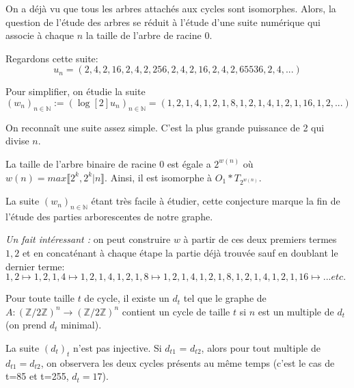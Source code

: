 \begin{rem}
On a d\'ej\`a vu que tous les arbres attach\'es aux cycles sont isomorphes. Alors, la question de l'\'etude des arbres se r\'eduit \`a l'\'etude d'une suite num\'erique qui associe \`a chaque $n$ la taille de l'arbre de racine $0$.

Regardons cette suite: \[u_n= (2,4,2,16,2,4,2,256,2,4,2,16,2,4,2,65536,2,4,...)\]

Pour simplifier, on \'etudie la suite 
\[({w_n})_{n \in \mathbb{N}} :=(\log[2]{u_n})_{n \in \mathbb{N}}= (1,2,1,4,1,2,1,8,1,2,1,4,1,2,1,16,1,2,...)\]

On reconna\^it une suite assez simple. C'est la plus grande puissance de 2 qui divise $n$.
\end{rem}

\begin{conj}\label{conj1}
La taille de l'arbre binaire de racine $0$ est \'egale a $2^{w(n)}$ o\`u $w(n) = max \llbracket 2^k, 2^k | n\rrbracket $. Ainsi, il est isomorphe \`a $O_1*T_{2^{w(n)}}$.
\end{conj}

La suite $(w_n)_{n \in \mathbb{N}}$ \'etant tr\`es facile \`a \'etudier, cette conjecture marque la fin de l'\'etude des parties arborescentes de notre graphe.

\begin{rem}
\textit{Un fait int\'eressant :} on peut construire $w$ \`a partir de ces deux premiers termes $1,2$ et en concat\'enant \`a chaque \'etape la partie d\'ej\`a trouv\'ee sauf en doublant le dernier terme: $1,2 \mapsto 1,2,1,4 \mapsto 1,2,1,4,1,2,1,8 \mapsto 1,2,1,4,1,2,1,8,1,2,1,4,1,2,1,16 \mapsto ... etc.$
\end{rem}

\begin{conj}\label{conj2}
Pour toute taille $t$ de cycle, il existe un $d_t$ tel que le graphe de $A: (\mathbb{Z}/2\mathbb{Z})^n \rightarrow (\mathbb{Z}/2\mathbb{Z})^n$ contient un cycle de taille $t$ si $n$ est un multiple de $d_t$ (on prend $d_t$ minimal). 
\end{conj}

\begin{rem}
La suite $(d_t)_t$ n'est pas injective. Si $d_{t1}$ = $d_{t2}$, alors pour tout multiple de 
$d_{t1}=d_{t2}$, on observera les deux cycles pr\'esents au même temps (c'est le cas de t=85 et t=255, $d_t = 17$). \newline
\end{rem}

